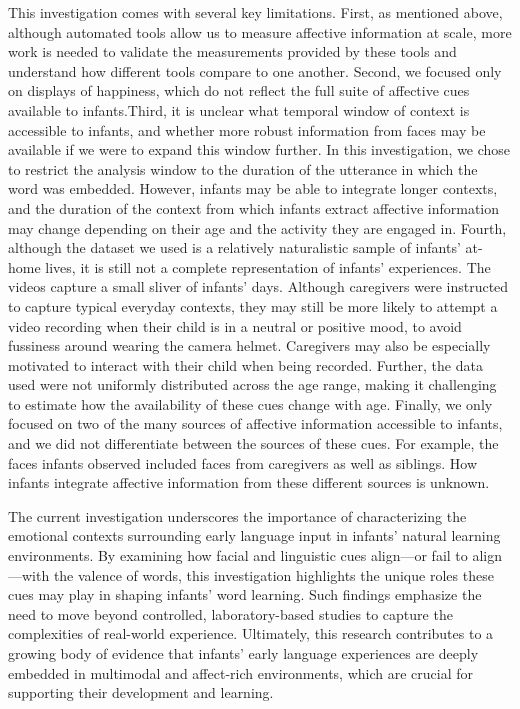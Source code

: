 \documentclass[10pt, letterpaper]{article}
\begin{document}
This investigation comes with several key limitations. First, as
mentioned above, although automated tools allow us to measure affective
information at scale, more work is needed to validate the measurements
provided by these tools and understand how different tools compare to
one another. Second, we focused only on displays of happiness, which do
not reflect the full suite of affective cues available to infants.Third,
it is unclear what temporal window of context is accessible to infants,
and whether more robust information from faces may be available if we
were to expand this window further. In this investigation, we chose to
restrict the analysis window to the duration of the utterance in which
the word was embedded. However, infants may be able to integrate longer
contexts, and the duration of the context from which infants extract
affective information may change depending on their age and the activity
they are engaged in. Fourth, although the dataset we used is a
relatively naturalistic sample of infants' at-home lives, it is still
not a complete representation of infants' experiences. The videos
capture a small sliver of infants' days. Although caregivers were
instructed to capture typical everyday contexts, they may still be more
likely to attempt a video recording when their child is in a neutral or
positive mood, to avoid fussiness around wearing the camera helmet.
Caregivers may also be especially motivated to interact with their child
when being recorded. Further, the data used were not uniformly
distributed across the age range, making it challenging to estimate how
the availability of these cues change with age. Finally, we only focused
on two of the many sources of affective information accessible to
infants, and we did not differentiate between the sources of these cues.
For example, the faces infants observed included faces from caregivers
as well as siblings. How infants integrate affective information from
these different sources is unknown.

The current investigation underscores the importance of characterizing
the emotional contexts surrounding early language input in infants'
natural learning environments. By examining how facial and linguistic
cues align---or fail to align---with the valence of words, this
investigation highlights the unique roles these cues may play in shaping
infants' word learning. Such findings emphasize the need to move beyond
controlled, laboratory-based studies to capture the complexities of
real-world experience. Ultimately, this research contributes to a
growing body of evidence that infants' early language experiences are
deeply embedded in multimodal and affect-rich environments, which are
crucial for supporting their development and learning.
\end{document}
